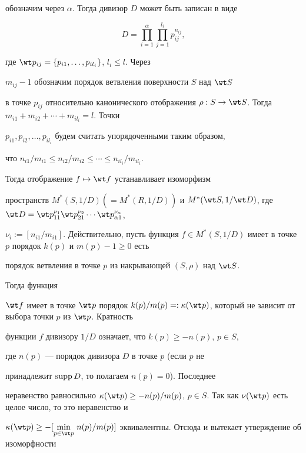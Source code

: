обозначим через $\alpha$. Тогда дивизор $D$ может быть записан в виде


$$


D=\prod^\alpha_{i=1}\prod^{l_i}_{j=1}p^{n_{ij}}_{ij},


$$


где $\wt p_{ij}=\{p_{i1},\dotsc,p_{il_i}\}$, $l_i\le l$. Через


$m_{ij}-1$ обозначим порядок ветвления поверхности $S$ над $\wt S$


в точке $p_{ij}$ относительно канонического отображения $\rho: S\to


\wt S$. Тогда $m_{i1}+m_{i2}+\dotsb +m_{il_i}=l$. Точки


$p_{i1}, p_{i2},\dots,p_{il_i}$ будем считать упорядоченными таким образом,


что $n_{i1}/m_{i1}\le n_{i2}/m_{i2}\le\dotsb\le n_{il_i}/m_{il_i}$.


Тогда отображение $f\mapsto\wt f$ устанавливает изоморфизм


пространств $M^*(S,1/D)$\linebreak $(=M^*(R,1/D))$ и $M^*(\wt S,1/\wt


D)$, где $\wt D=\wt p^{\nu_1}_{11}\wt


p^{\nu_2}_{21}\dotsb \wt p^{\nu_\alpha}_{\alpha 1}$,


$\nu_i:=[n_{i1}/m_{i1}]$. Действительно, пусть функция $f\in


M^*(S,1/D)$ имеет в точке $p$ порядок $k(p)$ и $m(p)-1\ge 0$ есть


порядок ветвления в точке $p$ из накрывающей $(S,\rho)$ над $\wt S$.


Тогда функция


$\wt f$ имеет в точке $\wt p$ порядок $k(p)/m(p)=:\kappa (\wt


p)$, который не зависит от выбора точки $p$ из $\wt p$. Кратность


функции $f$ дивизору $1/D$ означает, что $k(p)\ge -n(p)$, $p\in S$,


где $n(p)$ --- порядок дивизора $D$ в точке $p$ (если $p$ не


принадлежит $\operatorname{supp} D$, то полагаем $n(p)=0$). Последнее


неравенство равносильно $\kappa (\wt p)\ge -n(p)/m(p)$, $p\in


S$. Так как $\nu (\wt p)$ есть целое число, то это неравенство и


$\kappa (\wt p)\ge -[\min\limits_{p\in\wt


p}\,n(p)/m(p)]$ эквивалентны. Отсюда и вытекает утверждение об изоморфности


